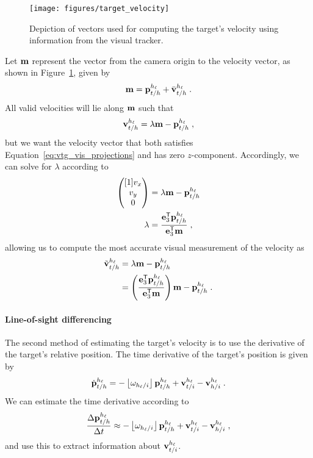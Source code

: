 \begin{figure}[hbt]
  \centering
  \texttt{[image: figures/target\_velocity]}
  \caption{Depiction of vectors used for computing the target's velocity using information from the visual tracker.}
  \label{fig:camera_vel_vectors}
\end{figure}

Let $\m$ represent the vector from the camera origin to the velocity vector, as shown in Figure~\ref{fig:camera_vel_vectors}, given by
\begin{equation}
    \m = \ptghv+\veltghv[\bar]\;.
\end{equation}
All valid velocities will lie along $\m$ such that
\begin{equation} \label{eq:vtg_vis_projections}
    \veltghv = \lambda \m - \ptghv\;,
\end{equation}
but we want the velocity vector that both satisfies Equation~\eqref{eq:vtg_vis_projections} and has zero $z$-component.
Accordingly, we can solve for $\lambda$ according to
\begin{align}
    \pmat{v_x \\ v_y \\ 0} &= \lambda \m - \ptghv \\
    \lambda &= \frac{\e_3^\transpose \ptghv}{\e_3^\transpose \m}\;,
\end{align}
allowing us to compute the most accurate visual measurement of the velocity as
\begin{align} \label{eq:vtg_vis_measurement}
    \veltghv[\tilde] &= \lambda \m - \ptghv \\
      &= \left(\frac{\e_3^\transpose \ptghv}{\e_3^\transpose \m} \right)\m - \ptghv\;.
\end{align}


\paragraph{Line-of-sight differencing}
The second method of estimating the target's velocity is to use the derivative of the target's relative position. The time derivative of the target's position is given by
\begin{equation}
    \ptghv[\dot] = -\skewmat{\angvel_{\HVwrtI}}\ptghv + \vel_{\TGwrtI}^\hv - \vel_{\HwrtI}^\hv\;.
\end{equation}
We can estimate the time derivative according to
\begin{equation} \label{eq:vtg_delta_pos}
    \frac{\Delta\ptghv}{\Delta t} \approx -\skewmat{\angvel_{\HVwrtI}}\ptghv + \vel_{\TGwrtI}^\hv - \vel_{\HwrtI}^\hv\;,
\end{equation}
and use this to extract information about $\vel_{\TGwrtI}^\hv$.

